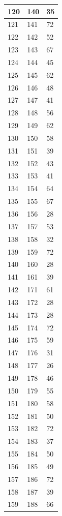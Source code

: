 \begin{tabular}{p{}p{}p{}}
\hline
120 & 140 & 35 \\
\hline
121 & 141 & 72 \\
\hline
122 & 142 & 52 \\
\hline
123 & 143 & 67 \\
\hline
124 & 144 & 45 \\
\hline
125 & 145 & 62 \\
\hline
126 & 146 & 48 \\
\hline
127 & 147 & 41 \\
\hline
128 & 148 & 56 \\
\hline
129 & 149 & 62 \\
\hline
130 & 150 & 58 \\
\hline
131 & 151 & 39 \\
\hline
132 & 152 & 43 \\
\hline
133 & 153 & 41 \\
\hline
134 & 154 & 64 \\
\hline
135 & 155 & 67 \\
\hline
136 & 156 & 28 \\
\hline
137 & 157 & 53 \\
\hline
138 & 158 & 32 \\
\hline
139 & 159 & 72 \\
\hline
140 & 160 & 28 \\
\hline
141 & 161 & 39 \\
\hline
142 & 171 & 61 \\
\hline
143 & 172 & 28 \\
\hline
144 & 173 & 28 \\
\hline
145 & 174 & 72 \\
\hline
146 & 175 & 59 \\
\hline
147 & 176 & 31 \\
\hline
148 & 177 & 26 \\
\hline
149 & 178 & 46 \\
\hline
150 & 179 & 55 \\
\hline
151 & 180 & 58 \\
\hline
152 & 181 & 50 \\
\hline
153 & 182 & 72 \\
\hline
154 & 183 & 37 \\
\hline
155 & 184 & 50 \\
\hline
156 & 185 & 49 \\
\hline
157 & 186 & 72 \\
\hline
158 & 187 & 39 \\
\hline
159 & 188 & 66 \\

\end{tabular}
